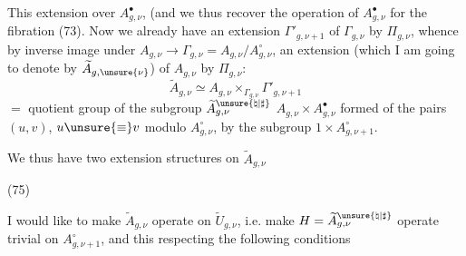  This extension   over \(A_{g,\nu}^{\bullet}\),  (and we thus recover the operation of \(A_{g,\nu}^{\bullet}\) for the fibration (73). Now we already have an extension \(\Gamma'_{g,\nu+1}\) of \(\Gamma_{g,\nu}\) by \(\Pi_{g,\nu}\), whence by inverse image under \(A_{g,\nu}\to\Gamma_{g,\nu}=A_{g,\nu}/A_{g,\nu}^{\circ}\), an extension (which I am going to denote by \(\widetilde A_{g,\unsure{\nu}}\)) of \(A_{g,\nu}\) by \(\Pi_{g,\nu}\):
\[
 \widetilde A_{g,\nu}\simeq A_{g,\nu}\mathbin{\times}_{\Gamma_{g,\nu}}\Gamma'_{g,\nu+1}
 \tag{74}
\]
\(=\) quotient group of the subgroup  \(\widetilde A_{g,\nu}^{\unsure{\natural|\sharp}}\)  \(A_{g,\nu}\times A_{g,\nu}^{\bullet}\) formed of the pairs \((u,v)\), \(u\unsure{\equiv}v\)  modulo \(A_{g,\nu}^{\circ}\), by the subgroup  \(1\times A_{g,\nu+1}^{\circ}\).

We thus have two  extension structures on \(\widetilde A_{g,\nu}\)

\begin{samepage}
(75) 
\end{samepage}



I would like to make \(\widetilde A_{g,\nu}\) operate on \(\widetilde U_{g,\nu}\), i.e. make  \(H=\widetilde A_{g,\nu}^{\unsure{\natural|\sharp}}\) operate   trivial on \(A_{g,\nu+1}^{\circ}\), and this respecting the following conditions

